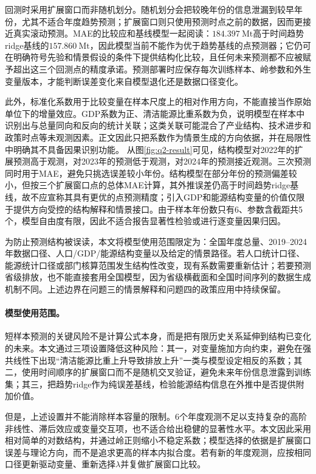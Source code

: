 \documentclass[12pt,a4paper]{ctexart}
\theoremstyle{definition}
\theoremstyle{plain}
\theoremstyle{remark}
\begin{document}
回测时采用扩展窗口而非随机划分。随机划分会把较晚年份的信息泄漏到较早年份，尤其不适合年度趋势预测；扩展窗口则只使用预测时点之前的数据，因而更接近真实滚动预测。MAE的比较应和基线模型一起阅读：$184.397\ \mathrm{Mt}$高于时间趋势ridge基线的$157.860\ \mathrm{Mt}$，因此模型当前不能作为优于趋势基线的点预测器；它仍可在明确符号先验和情景假设的条件下提供结构化比较，且任何未来预测都不应被赋予超出这三个回测点的精度承诺。预测部署时应保存每次训练样本、岭参数和外生变量版本，才能判断误差变化来自模型退化还是数据口径变化。

此外，标准化系数用于比较变量在样本尺度上的相对作用方向，不能直接当作原始单位下的增量效应。GDP系数为正、清洁能源比重系数为负，说明模型在样本中识别出与总量同向和反向的统计关联；这类关联可能混合了产业结构、技术进步和政策时点等未观测因素。正文因此只把系数作为情景生成的方向依据，并在局限性中明确其不具备因果识别功能。
从图\ref{fig:q2-result}可见，结构模型对2022年的扩展预测高于观测，对2023年的预测低于观测，对2024年的预测接近观测。三次预测同时用于MAE，避免只挑选误差较小年份。结构模型在部分年份的预测偏差较小，但按三个扩展窗口点的总体MAE计算，其外推误差仍高于时间趋势ridge基线，故不应宣称其具有更优的点预测精度；引入GDP和能源结构变量的价值仅限于提供方向受控的结构解释和情景接口。由于样本年份数只有6、参数含截距共5个，模型自由度有限，因此不适合报告显著性检验或进行逐变量因果归因。

为防止预测结构被误读，本文将模型使用范围限定为：全国年度总量、2019--2024年数据口径、人口/GDP/能源结构变量以及给定的情景路径。若人口统计口径、能源统计口径或部门核算范围发生结构性改变，现有系数需要重新估计；若要预测省级排放，也不能直接套用全国模型，因为省级横截面和全国时间序列的数据生成机制不同。上述边界在问题三的情景解释和问题四的政策应用中持续保留。
\paragraph{模型使用范围。}
短样本预测的关键风险不是计算公式本身，而是把有限历史关系延伸到结构已变化的未来。本文通过三项设置降低这种风险：其一，对变量施加方向约束，避免在强共线性下出现“清洁能源比重上升导致排放上升”一类与模型设定相反的系数；其二，使用时间顺序的扩展窗口而不是随机交叉验证，避免未来年份信息泄露到训练集；其三，把趋势ridge作为纯误差基线，检验能源结构信息在外推中是否提供附加价值。

但是，上述设置并不能消除样本容量的限制。6个年度观测不足以支持复杂的高阶非线性、滞后效应或变量交互项，也不适合给出稳健的显著性水平。本文因此采用相对简单的对数结构，并通过岭正则缩小不稳定系数；模型选择的依据是扩展窗口误差与理论方向，而不是追求更高的样本内拟合度。若有新的年度观测，应按相同口径更新驱动变量、重新选择$\lambda$并复做扩展窗口比较。
\end{document}
